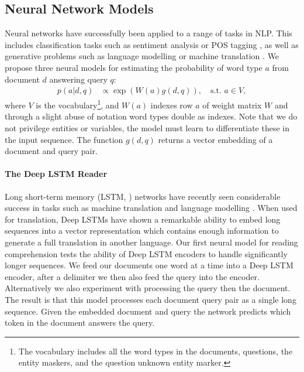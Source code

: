 \subsection{Neural Network Models}
Neural networks have successfully been applied to a range of tasks in NLP.
This includes classification tasks such as sentiment analysis
\cite{Kalchbrenner:2014:DCNN} or POS tagging \cite{Collobert:2011:NLP}, as well
as generative problems such as language modelling or machine translation
\cite{Sutskever:2014:SSLNN}.
We propose three neural models for estimating the probability of word type $a$
from document $d$ answering query $q$:
\begin{align*}
  p(a | d, q) &\propto \exp \left(W(a) g(d,q) \right), \quad\text{s.t. } a \in
  V,
\end{align*}
where $V$ is the vocabulary\footnote{The vocabulary includes all the word types
  in the documents, questions, the entity maskers, and the question unknown
  entity marker.},
and $W(a)$ indexes row $a$ of weight matrix $W$ and through a slight abuse of
notation word types double as indexes. Note that we do not privilege entities or
variables, the model must learn to differentiate these in the input sequence.
The function $g(d,q)$ returns a vector embedding of a document and query pair.

\paragraph{The Deep LSTM Reader}
Long short-term memory (LSTM, \cite{Hochreiter:1997:LSTM}) networks have
recently seen considerable success in tasks such as machine translation and
language modelling \cite{Sutskever:2014:SSLNN}. When used for translation, Deep
LSTMs \cite{Graves:2012:SSLRNN} have shown a remarkable ability to embed long
sequences into a vector representation which contains enough information to
generate a full translation in another language. Our first neural model for
reading comprehension tests the ability of Deep LSTM encoders to handle
significantly longer sequences. We feed our documents one word at a time into
a Deep LSTM encoder, after a delimiter we then also feed the query into the
encoder. Alternatively we also experiment with processing the query then the
document. The result is that this model processes each document query pair as a
single long sequence. Given the embedded document and query the network
predicts which token in the document answers the query.

